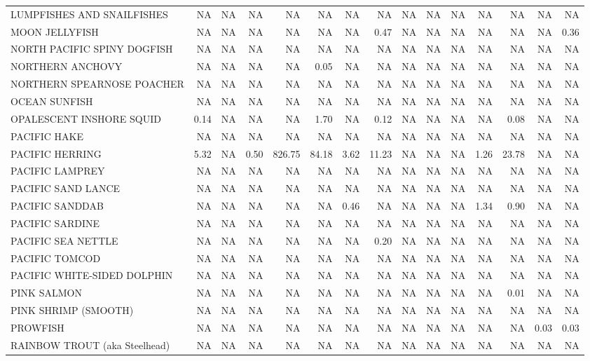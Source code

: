 \documentclass[12pt]{article}\usepackage[]{graphicx}\usepackage[]{color}
\begin{document}
\begin{landscape}
\begin{longtable}[t]{>{\raggedright\arraybackslash}p{3.6 cm}rrrrrrrrrrrrrr}
LUMPFISHES AND SNAILFISHES & NA & NA & NA & NA & NA & NA & NA & NA & NA & NA & NA & NA & NA & NA\\
MOON JELLYFISH & NA & NA & NA & NA & NA & NA & 0.47 & NA & NA & NA & NA & NA & NA & 0.36\\
NORTH PACIFIC SPINY DOGFISH & NA & NA & NA & NA & NA & NA & NA & NA & NA & NA & NA & NA & NA & NA\\
NORTHERN ANCHOVY & NA & NA & NA & NA & 0.05 & NA & NA & NA & NA & NA & NA & NA & NA & NA\\
NORTHERN SPEARNOSE POACHER & NA & NA & NA & NA & NA & NA & NA & NA & NA & NA & NA & NA & NA & NA\\
OCEAN SUNFISH & NA & NA & NA & NA & NA & NA & NA & NA & NA & NA & NA & NA & NA & NA\\
OPALESCENT INSHORE SQUID & 0.14 & NA & NA & NA & 1.70 & NA & 0.12 & NA & NA & NA & NA & 0.08 & NA & NA\\
PACIFIC HAKE & NA & NA & NA & NA & NA & NA & NA & NA & NA & NA & NA & NA & NA & NA\\
PACIFIC HERRING & 5.32 & NA & 0.50 & 826.75 & 84.18 & 3.62 & 11.23 & NA & NA & NA & 1.26 & 23.78 & NA & NA\\
PACIFIC LAMPREY & NA & NA & NA & NA & NA & NA & NA & NA & NA & NA & NA & NA & NA & NA\\
PACIFIC SAND LANCE & NA & NA & NA & NA & NA & NA & NA & NA & NA & NA & NA & NA & NA & NA\\
PACIFIC SANDDAB & NA & NA & NA & NA & NA & 0.46 & NA & NA & NA & NA & 1.34 & 0.90 & NA & NA\\
PACIFIC SARDINE & NA & NA & NA & NA & NA & NA & NA & NA & NA & NA & NA & NA & NA & NA\\
PACIFIC SEA NETTLE & NA & NA & NA & NA & NA & NA & 0.20 & NA & NA & NA & NA & NA & NA & NA\\
PACIFIC TOMCOD & NA & NA & NA & NA & NA & NA & NA & NA & NA & NA & NA & NA & NA & NA\\
PACIFIC WHITE-SIDED DOLPHIN & NA & NA & NA & NA & NA & NA & NA & NA & NA & NA & NA & NA & NA & NA\\
PINK SALMON & NA & NA & NA & NA & NA & NA & NA & NA & NA & NA & NA & 0.01 & NA & NA\\
PINK SHRIMP (SMOOTH) & NA & NA & NA & NA & NA & NA & NA & NA & NA & NA & NA & NA & NA & NA\\
PROWFISH & NA & NA & NA & NA & NA & NA & NA & NA & NA & NA & NA & NA & 0.03 & 0.03\\
RAINBOW TROUT (aka Steelhead) & NA & NA & NA & NA & NA & NA & NA & NA & NA & NA & NA & NA & NA & NA\\

\end{longtable}
\end{landscape}
\end{document}
